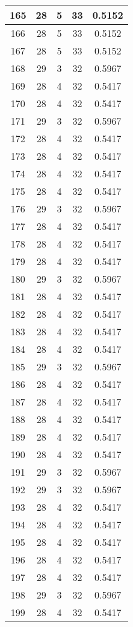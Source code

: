 \documentclass[letterpaper, 12pt]{article}
\begin{document}
\begin{longtable}{|c|c|c|c|c|}
\hline
165 & 28 & 5 & 33 & 0.5152 \\
\hline
166 & 28 & 5 & 33 & 0.5152 \\
\hline
167 & 28 & 5 & 33 & 0.5152 \\
\hline
168 & 29 & 3 & 32 & 0.5967 \\
\hline
169 & 28 & 4 & 32 & 0.5417 \\
\hline
170 & 28 & 4 & 32 & 0.5417 \\
\hline
171 & 29 & 3 & 32 & 0.5967 \\
\hline
172 & 28 & 4 & 32 & 0.5417 \\
\hline
173 & 28 & 4 & 32 & 0.5417 \\
\hline
174 & 28 & 4 & 32 & 0.5417 \\
\hline
175 & 28 & 4 & 32 & 0.5417 \\
\hline
176 & 29 & 3 & 32 & 0.5967 \\
\hline
177 & 28 & 4 & 32 & 0.5417 \\
\hline
178 & 28 & 4 & 32 & 0.5417 \\
\hline
179 & 28 & 4 & 32 & 0.5417 \\
\hline
180 & 29 & 3 & 32 & 0.5967 \\
\hline
181 & 28 & 4 & 32 & 0.5417 \\
\hline
182 & 28 & 4 & 32 & 0.5417 \\
\hline
183 & 28 & 4 & 32 & 0.5417 \\
\hline
184 & 28 & 4 & 32 & 0.5417 \\
\hline
185 & 29 & 3 & 32 & 0.5967 \\
\hline
186 & 28 & 4 & 32 & 0.5417 \\
\hline
187 & 28 & 4 & 32 & 0.5417 \\
\hline
188 & 28 & 4 & 32 & 0.5417 \\
\hline
189 & 28 & 4 & 32 & 0.5417 \\
\hline
190 & 28 & 4 & 32 & 0.5417 \\
\hline
191 & 29 & 3 & 32 & 0.5967 \\
\hline
192 & 29 & 3 & 32 & 0.5967 \\
\hline
193 & 28 & 4 & 32 & 0.5417 \\
\hline
194 & 28 & 4 & 32 & 0.5417 \\
\hline
195 & 28 & 4 & 32 & 0.5417 \\
\hline
196 & 28 & 4 & 32 & 0.5417 \\
\hline
197 & 28 & 4 & 32 & 0.5417 \\
\hline
198 & 29 & 3 & 32 & 0.5967 \\
\hline
199 & 28 & 4 & 32 & 0.5417 \\
\hline
\end{longtable}
\end{document}
